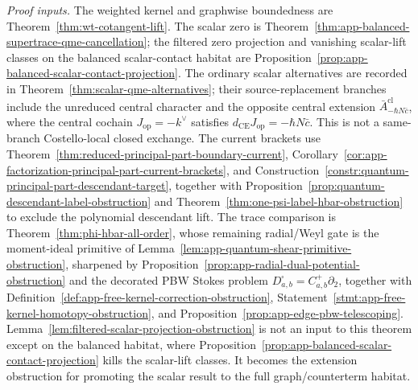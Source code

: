 \begin{stmt}
  \emph{Proof inputs.}
  The weighted kernel and graphwise boundedness are
  Theorem~\ref{thm:wt-cotangent-lift}.  The scalar zero is
  Theorem~\ref{thm:app-balanced-supertrace-qme-cancellation}; the
  filtered zero projection and vanishing scalar-lift classes on the
  balanced scalar-contact habitat are
  Proposition~\ref{prop:app-balanced-scalar-contact-projection}.  The
  ordinary scalar alternatives are recorded in
  Theorem~\ref{thm:scalar-qme-alternatives}; their source-replacement
  branches include the unreduced central character and the opposite
  central extension
  \(\bar A^{\mathrm{cl}}_{-\hbar N\bar c}\), where the central cochain
  \(J_{\mathrm{op}}=-k^\vee\) satisfies
  \(d_{\mathrm{CE}}J_{\mathrm{op}}=-\hbar N\bar c\).  This is not a
  same-branch Costello-local closed exchange.  The current brackets use
  Theorem~\ref{thm:reduced-principal-part-boundary-current},
  Corollary~\ref{cor:app-factorization-principal-part-current-brackets},
  and Construction~\ref{constr:quantum-principal-part-descendant-target},
  together with Proposition~\ref{prop:quantum-descendant-label-obstruction}
  and Theorem~\ref{thm:one-psi-label-hbar-obstruction} to exclude the
  polynomial descendant lift.  The trace comparison is
  Theorem~\ref{thm:phi-hbar-all-order}, whose remaining radial/Weyl gate is
  the moment-ideal primitive of
  Lemma~\ref{lem:app-quantum-shear-primitive-obstruction}, sharpened by
  Proposition~\ref{prop:app-radial-dual-potential-obstruction} and the
  decorated PBW Stokes problem
  \(D^\square_{a,b}=C^+_{a,b}\partial_2\), together with
  Definition~\ref{def:app-free-kernel-correction-obstruction},
  Statement~\ref{stmt:app-free-kernel-homotopy-obstruction}, and
  Proposition~\ref{prop:app-edge-pbw-telescoping}.
  Lemma~\ref{lem:filtered-scalar-projection-obstruction}
  is not an input to this theorem except on the balanced habitat, where
  Proposition~\ref{prop:app-balanced-scalar-contact-projection} kills
  the scalar-lift classes.  It becomes the extension obstruction for
  promoting the scalar result to the full graph/counterterm habitat.


\end{stmt}
